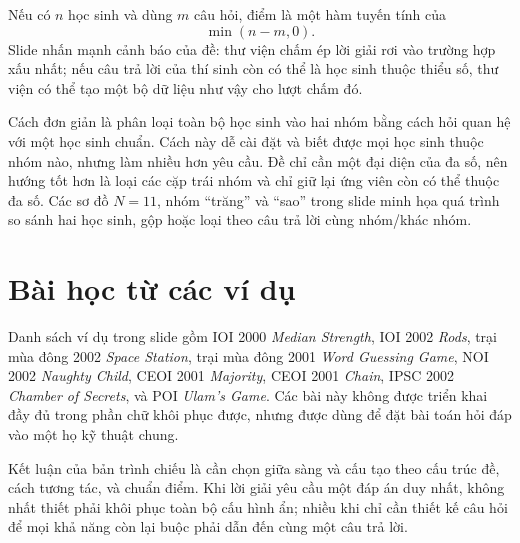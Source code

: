 \documentclass[11pt]{article}
\begin{document}
Nếu có \(n\) học sinh và dùng \(m\) câu hỏi, điểm là một hàm tuyến tính của
\[
  \min(n-m,0).
\]
Slide nhấn mạnh cảnh báo của đề: thư viện chấm ép lời giải rơi vào trường
hợp xấu nhất; nếu câu trả lời của thí sinh còn có thể là học sinh thuộc
thiểu số, thư viện có thể tạo một bộ dữ liệu như vậy cho lượt chấm đó.

Cách đơn giản là phân loại toàn bộ học sinh vào hai nhóm bằng cách hỏi quan
hệ với một học sinh chuẩn. Cách này dễ cài đặt và biết được mọi học sinh
thuộc nhóm nào, nhưng làm nhiều hơn yêu cầu. Đề chỉ cần một đại diện của đa
số, nên hướng tốt hơn là loại các cặp trái nhóm và chỉ giữ lại ứng viên còn
có thể thuộc đa số. Các sơ đồ \(N=11\), nhóm ``trăng'' và ``sao'' trong slide
minh họa quá trình so sánh hai học sinh, gộp hoặc loại theo câu trả lời cùng
nhóm/khác nhóm.

\section{Bài học từ các ví dụ}

Danh sách ví dụ trong slide gồm IOI 2000 \textit{Median Strength}, IOI 2002
\textit{Rods}, trại mùa đông 2002 \textit{Space Station}, trại mùa đông 2001
\textit{Word Guessing Game}, NOI 2002 \textit{Naughty Child}, CEOI 2001
\textit{Majority}, CEOI 2001 \textit{Chain}, IPSC 2002 \textit{Chamber of
Secrets}, và POI \textit{Ulam's Game}. Các bài này không được triển khai đầy
đủ trong phần chữ khôi phục được, nhưng được dùng để đặt bài toán hỏi đáp vào
một họ kỹ thuật chung.

Kết luận của bản trình chiếu là cần chọn giữa sàng và cấu tạo theo cấu trúc
đề, cách tương tác, và chuẩn điểm. Khi lời giải yêu cầu một đáp án duy nhất,
không nhất thiết phải khôi phục toàn bộ cấu hình ẩn; nhiều khi chỉ cần thiết
kế câu hỏi để mọi khả năng còn lại buộc phải dẫn đến cùng một câu trả lời.
\end{document}
